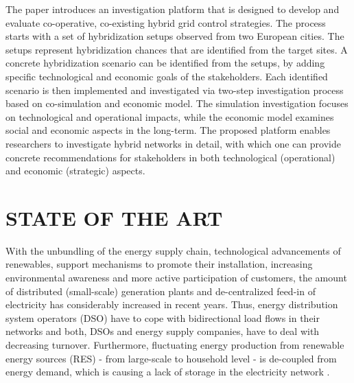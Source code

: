 \documentclass[a4paper,twoside]{article}
\begin{document}
The paper introduces an investigation platform that is designed   
to develop and evaluate co-operative, co-existing hybrid grid control 
strategies. The process starts with a set of hybridization 
setups observed from two European cities. The setups represent
hybridization chances that are identified from the target sites. 
A concrete hybridization scenario can be identified from the setups,
by adding specific technological and economic goals of the
stakeholders. Each identified scenario is then implemented and
investigated via two-step investigation process based on
co-simulation and economic model. The simulation investigation 
focuses on technological and operational impacts, while the
economic model examines social and economic aspects in the
long-term. 
The proposed platform enables researchers to investigate hybrid
networks in detail, with which one can provide concrete
recommendations for stakeholders in both technological (operational)
and economic (strategic) aspects.  

\section{\uppercase{State of the art}}
\label{sec:soa}
With the unbundling of the energy supply chain, technological
advancements of renewables, support mechanisms to promote their
installation, increasing environmental awareness and more active
participation of customers, the amount of distributed (small-scale)
generation plants and de-centralized feed-in of electricity has
considerably increased in recent years. Thus, energy distribution
system operators (DSO) have to cope with bidirectional load flows in
their networks and both, DSOs and energy supply companies, have to
deal with decreasing turnover. Furthermore, fluctuating energy
production from renewable energy sources (RES) - from large-scale to
household level - is de-coupled from  energy demand, which is 
causing a lack of storage in the electricity network
\cite{trebolle_2010}. 
\end{document}
